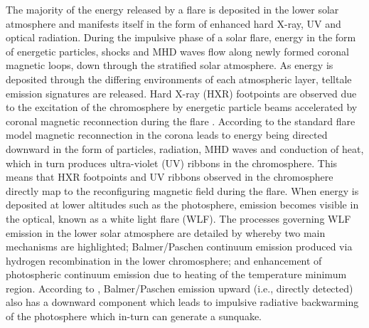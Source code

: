 The majority of the energy released by a flare is deposited in the lower solar atmosphere and manifests itself in the form of enhanced hard X-ray, UV and optical radiation. During the impulsive phase of a solar flare, energy in the form of energetic particles, shocks and MHD waves flow along newly formed coronal magnetic loops, down through the stratified solar atmosphere. As energy is deposited through the differing environments of each atmospheric layer, telltale emission signatures are released. Hard X-ray (HXR) footpoints are observed due to the excitation of the chromosphere by energetic particle beams accelerated by coronal magnetic reconnection during the flare \citep{1995ApJ...455..347A}. According to the standard flare model \citep{1964NASSP..50..451C, 1966Natur.211..695S, 1974SoPh...34..323H, 1976SoPh...50...85K} magnetic reconnection in the corona leads to energy being directed downward in the form of particles, radiation, MHD waves and conduction of heat, which in turn produces ultra-violet (UV) ribbons in the chromosphere. This means that HXR footpoints and UV ribbons observed in the chromosphere directly map to the reconfiguring magnetic field during the flare. When energy is deposited at lower altitudes such as the photosphere, emission becomes visible in the optical, known as a white light flare (WLF). The processes governing WLF emission in the lower solar atmosphere are detailed by \cite{2007ASPC..368..417D} whereby two main mechanisms are highlighted; Balmer/Paschen continuum emission produced via hydrogen recombination in the lower chromosphere; and enhancement of photospheric continuum emission due to heating of the temperature minimum region. According to \cite{1989SoPh..124..303M}, Balmer/Paschen emission upward (i.e., directly detected) also has a downward component which leads to impulsive radiative backwarming of the photosphere which in-turn can generate a sunquake.




